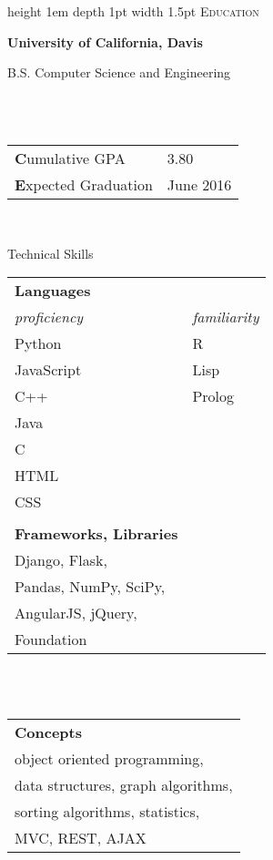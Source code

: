 \documentclass[letterpaper]{article}
\newcommand{\sectiontitle}[1]{
	{\color{magenta} \vline height 1em depth 1pt width 1.5pt}%
	{\large \colorbox{offwhite}{\color{black} \textsc{#1}}}
	\vspace*{0.5em}
}
\newcommand{\sectionseparator}[1]{
	\hline
	\vspace*{1em}
}
\begin{document}
	\begin{minipage}[t]{0.35\textwidth}

		\sectiontitle{Education}

		\textbf{University of California, Davis}
		\\
		\begin{small}
			B.S. Computer Science and Engineering
		\end{small}
		\\
		\vspace*{1em}
		\\
		\begin{tabular}{l l}
			{\textbf Cumulative GPA} & {3.80} \\
			{\textbf Expected Graduation} & {June 2016} \\
		\end{tabular}
		\\
		\vspace*{1em}

		\sectionseparator

		\sectiontitle{Technical Skills}

		\begin{tabular}{l l}
			\textbf{Languages} 		\\
			\textit{proficiency} 	& \textit{familiarity} \\
			Python 					& R \\
			JavaScript 				& Lisp \\
			C++ 					& Prolog \\
			Java 					& \\
			C 						& \\
			HTML 					& \\
			CSS						& \\
			{}						& \\
			\textbf{Frameworks, Libraries} 	\\
			Django, Flask, \\
			Pandas, NumPy, SciPy, \\
			AngularJS, jQuery, \\
			Foundation
		\end{tabular}
		\\
		\vspace*{1em}
		\\
		\begin{tabular}{l}
			\textbf{Concepts} \\
			object oriented programming, \\
			data structures, graph algorithms, \\
			sorting algorithms, statistics, \\
			MVC, REST, AJAX \\
		\end{tabular}
		\vspace*{1em}


\end{minipage}
\end{document}

